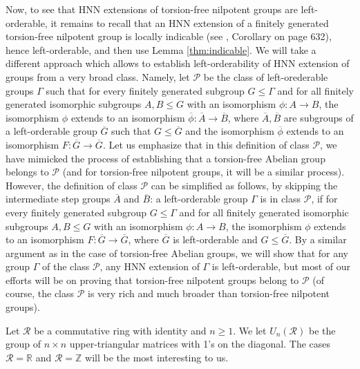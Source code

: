 \documentclass[12pt]{amsart}
\theoremstyle{definition}
\begin{document}
   Now, to see that HNN extensions of torsion-free nilpotent groups are left-orderable, it remains to recall that an HNN extension of a finitely generated torsion-free nilpotent group is locally indicable (see \cite{KS}, Corollary on page 632), hence left-orderable, and then use Lemma \ref{thm:indicable}. We will take a different approach which allows to establish left-orderability of HNN extension of groups from a very broad class.  Namely, let $\mathcal{P}$ be the class of left-orederable groups $\Gamma $ such that for every finitely generated subgroup $G\leq \Gamma $ and for all finitely generated isomorphic subgroups $A, B\leq G$ with an isomorphism $\phi :A\to B$, the isomorphism $\phi $ extends to an isomorphism $\overline{\phi }:\overline{A}\to \overline{B}$, where $\overline{A},\overline{B}$ are subgroups of a left-orderable group $ \overline{G}$ such that $G\leq \overline{G}$ and the isomorphism $\overline{\phi }$ extends to an isomorphism $F:\overline{G}\to \overline{G}$. Let us emphasize that in this definition of class $\mathcal{P}$, we have mimicked the process of establishing that a torsion-free Abelian group belongs to $\mathcal{P}$ (and for torsion-free nilpotent groups, it will be a similar process). However, the definition of class $\mathcal{P}$ can be simplified as follows, by skipping the intermediate step groups $\overline{A}$ and $\overline{B}$: a left-orderable group $\Gamma $ is in class $\mathcal{P}$, if for every finitely generated subgroup $G\leq \Gamma $ and for all finitely generated isomorphic subgroups $A, B\leq G$ with an isomorphism $\phi :A\to B$, the isomorphism $\phi $ extends to an isomorphism $F:\overline{G}\to \overline{G}$, where $\overline{G}$ is left-orderable and $G\leq \overline{G}$. By a similar argument as in the case of torsion-free Abelian groups, we will show that for any group $\Gamma $ of the class $\mathcal{P}$, any HNN extension of $\Gamma $ is left-orderable, but most of our efforts will be on proving that torsion-free nilpotent groups belong to $\mathcal{P}$ (of course, the class $\mathcal{P}$ is very rich and much broader than torsion-free nilpotent groups).   

    \medskip 

    
   
   Let $\mathcal{R}$ be a commutative ring with identity and $n\geq 1$. We let $U_n(\mathcal{R})$ be the group of $n\times n$  upper-triangular matrices with 1's on the diagonal. The cases $\mathcal{R} = \mathbb{R}$ and $\mathcal{R} = \mathbb{Z}$ will be the most interesting to us.
   
\end{document}

